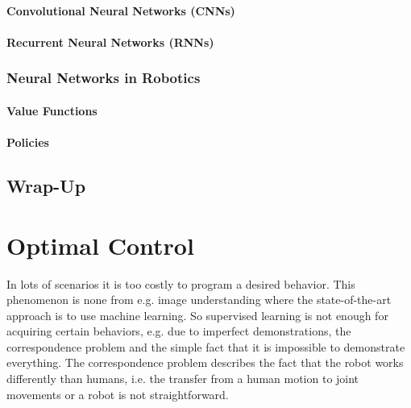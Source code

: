 			\subsubsection{Convolutional Neural Networks (CNNs)} %

			\subsubsection{Recurrent Neural Networks (RNNs)} %

		\subsection{Neural Networks in Robotics} %

			\subsubsection{Value Functions} %

			\subsubsection{Policies} %

	\section{Wrap-Up} %

\chapter{Optimal Control}
	\label{c:optimalControl}

	In lots of scenarios it is too costly to program a desired behavior. This phenomenon is none from e.g. image understanding where the state-of-the-art approach is to use machine learning. So supervised learning is not enough for acquiring certain behaviors, e.g. due to imperfect demonstrations, the correspondence problem and the simple fact that it is impossible to demonstrate everything. The correspondence problem describes the fact that the robot works differently than humans, i.e. the transfer from a human motion to joint movements or a robot is not straightforward.

